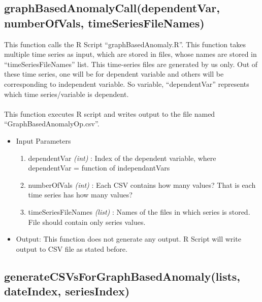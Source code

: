 \subsection{graphBasedAnomalyCall(dependentVar, numberOfVals, 
timeSeriesFileNames)}

This function calls the R Script ``graphBasedAnomaly.R''. This function takes 
multiple time series as input, which are stored in files, whose names are stored 
in ``timeSeriesFileNames'' list. This time-series files are generated by us 
only. Out of these time series, one will be for dependent variable and others 
will be corresponding to independent variable. So variable, ``dependentVar'' 
represents which time series/variable is dependent.\\
\\
This function executes R script and writes output to the file named 
``GraphBasedAnomalyOp.csv''.

\begin{itemize}
 \item Input Parameters
 
 \begin{enumerate}
  \item dependentVar \textit{(int)} : Index of the dependent variable, where 
dependentVar = function of independantVars
  \item numberOfVals \textit{(int)} : Each CSV contains how many values? That 
is each time series has how many values?
  \item timeSeriesFileNames \textit{(list)} : Names of the files in which series 
is stored. File should contain only series values.

 \end{enumerate}

 \item Output: This function does not generate any output. R Script will write 
output to CSV file as stated before.

 
\end{itemize}


\subsection{generateCSVsForGraphBasedAnomaly(lists, dateIndex, seriesIndex)}

